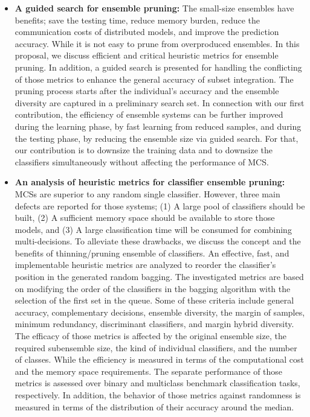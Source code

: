 \begin{itemize}
    \item \textbf{A guided search for ensemble pruning:} The small-size ensembles have benefits; save the testing time, reduce memory burden, reduce the communication costs of distributed models, and improve the prediction accuracy. While it is not easy to prune from overproduced ensembles. In this proposal, we discuss efficient and critical heuristic metrics for ensemble pruning. In addition, a guided search is presented for handling the conflicting of those metrics to enhance the general accuracy of subset integration. The pruning process starts after the individual's accuracy and the ensemble diversity are captured in a preliminary search set. In connection with our first contribution, the efficiency of ensemble systems can be further improved during the learning phase, by fast learning from reduced samples, and during the testing phase, by reducing the ensemble size via guided search. For that, our contribution is to downsize the training data and to downsize the classifiers simultaneously without affecting the performance of MCS.
     \item \textbf{An analysis of heuristic metrics for classifier ensemble pruning:} MCSs are superior to any random single classifier. However, three main defects are reported for those systems; (1) A large pool of classifiers should be built, (2) A sufficient memory space should be available to store those models, and (3) A large classification time will be consumed for combining multi-decisions. To alleviate these drawbacks, we discuss the concept and the benefits of thinning/pruning ensemble of classifiers. An effective, fast, and implementable heuristic metrics are analyzed to reorder the classifier's position in the generated random bagging. The investigated metrics are based on modifying the order of the classifiers in the bagging algorithm with the selection of the first set in the queue. Some of these criteria include general accuracy, complementary decisions, ensemble diversity, the margin of samples, minimum redundancy, discriminant classifiers, and margin hybrid diversity. The efficacy of those metrics is affected by the original ensemble size, the required subensemble size, the kind of individual classifiers, and the number of classes. While the efficiency is measured in terms of the computational cost and the memory space requirements. The separate performance of those metrics is assessed over binary and multiclass benchmark classification tasks, respectively.  In addition, the behavior of those metrics against randomness is measured in terms of the distribution of their accuracy around the median.
\end{itemize}



